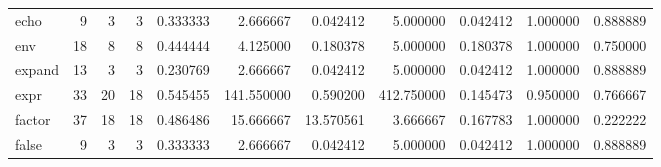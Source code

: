 \begin{longtable}{lrrrrrrrrrr}
echo      &                                       9 &                  3 &                                 3 &                                   0.333333 &                               2.666667 &                                     0.042412 &                          5.000000 &                                0.042412 &                           1.000000 &                                           0.888889 \\
env       &                                      18 &                  8 &                                 8 &                                   0.444444 &                               4.125000 &                                     0.180378 &                          5.000000 &                                0.180378 &                           1.000000 &                                           0.750000 \\
expand    &                                      13 &                  3 &                                 3 &                                   0.230769 &                               2.666667 &                                     0.042412 &                          5.000000 &                                0.042412 &                           1.000000 &                                           0.888889 \\
expr      &                                      33 &                 20 &                                18 &                                   0.545455 &                             141.550000 &                                     0.590200 &                        412.750000 &                                0.145473 &                           0.950000 &                                           0.766667 \\
factor    &                                      37 &                 18 &                                18 &                                   0.486486 &                              15.666667 &                                    13.570561 &                          3.666667 &                                0.167783 &                           1.000000 &                                           0.222222 \\
false     &                                       9 &                  3 &                                 3 &                                   0.333333 &                               2.666667 &                                     0.042412 &                          5.000000 &                                0.042412 &                           1.000000 &                                           0.888889 \\

\end{longtable}
